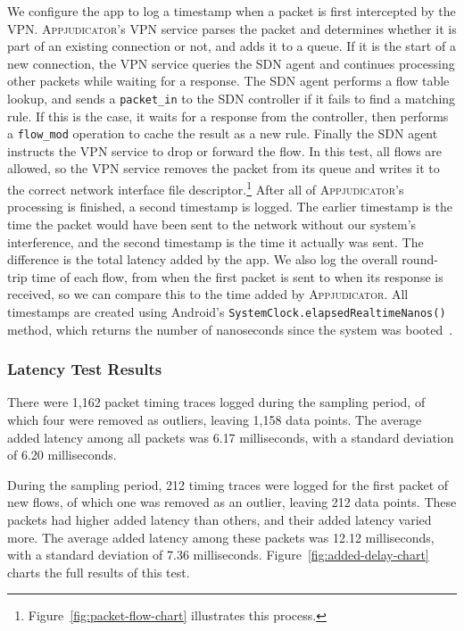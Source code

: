 We configure the app to log a timestamp when a packet is first intercepted by
the VPN. \textsc{Appjudicator}'s VPN service parses the packet and determines
whether it is part of an existing connection or not, and adds it to a queue. If
it is the start of a new connection, the VPN service queries the SDN agent and
continues processing other packets while waiting for a response. The SDN agent
performs a flow table lookup, and sends a \texttt{packet\_in} to the SDN
controller if it fails to find a matching rule. If this is the case, it waits
for a response from the controller, then performs a \texttt{flow\_mod} operation
to cache the result as a new rule. Finally the SDN agent instructs the VPN
service to drop or forward the flow. In this test, all flows are allowed, so the
VPN service removes the packet from its queue and writes it to the correct
network interface file descriptor.\footnote{Figure~\ref{fig:packet-flow-chart}
	illustrates this process.} After all of \textsc{Appjudicator}'s processing
is finished, a second timestamp is logged. The earlier timestamp is the time the
packet would have been sent to the network without our system's interference,
and the second timestamp is the time it actually was sent. The difference is the
total latency added by the app. We also log the overall round-trip time of each
flow, from when the first packet is sent to when its response is received, so we
can compare this to the time added by \textsc{Appjudicator}. All timestamps are
created using Android's \texttt{SystemClock.elapsedRealtimeNanos()} method,
which returns the number of nanoseconds since the system was
booted~\cite{androidsystemclock}.

\subsubsection{Latency Test Results}
\label{sec:latency-test-results}

There were 1,162 packet timing traces logged during the sampling period, of
which four were removed as outliers, leaving 1,158 data points. The average
added latency among all packets was 6.17 milliseconds, with a standard deviation
of 6.20 milliseconds.

During the sampling period, 212 timing traces were logged for the first packet
of new flows, of which one was removed as an outlier, leaving 212 data points.
These packets had higher added latency than others, and their added latency
varied more. The average added latency among these packets was 12.12
milliseconds, with a standard deviation of 7.36 milliseconds.
Figure~\ref{fig:added-delay-chart} charts the full results of this test.

